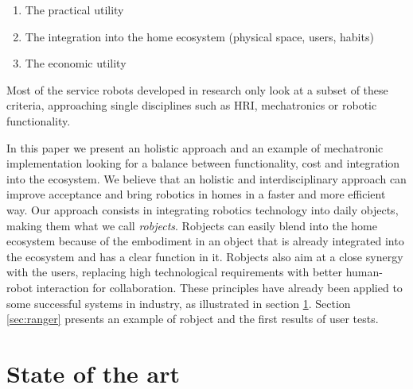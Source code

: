 \documentclass{sig-alternate}
\begin{document}
\begin{enumerate}
\item The practical utility
\item The integration into the home ecosystem (physical space, users, habits)
\item The economic utility
\end{enumerate}

Most of the service robots developed in research only look at a subset of these
criteria, approaching single disciplines such as HRI, mechatronics or robotic
functionality.

In this paper we present an holistic approach and an example of mechatronic
implementation looking for a balance between functionality, cost and integration
into the ecosystem.  We believe that an holistic and interdisciplinary approach
can improve acceptance and bring robotics in homes in a faster and more
efficient way.  Our approach consists in integrating robotics technology into
daily objects, making them what we call \textit{robjects}.  Robjects can easily
blend into the home ecosystem because of the embodiment in an object that is
already integrated into the ecosystem and has a clear function in it.  Robjects
also aim at a close synergy with the users, replacing high technological
requirements with better human-robot interaction for collaboration.  These
principles have already been applied to some successful systems in industry, as
illustrated in section \ref{sec:sota}. Section \ref{sec:ranger} presents an
example of robject and the first results of user tests.


\section{State of the art}
\label{sec:sota}
\end{document}
